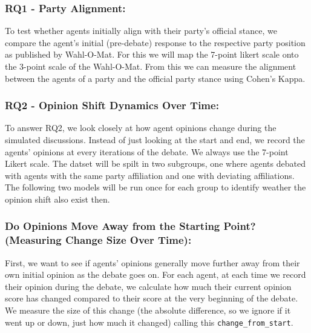 \documentclass[12pt]{article}
\begin{document}
\begin{multicols}{2}

\subsubsection{RQ1 - Party Alignment:}
To test whether agents initially align with their party's official stance, we compare the agent’s initial (pre-debate) response to the respective party position as published by Wahl-O-Mat. For this we will map the 7-point likert scale onto the 3-point scale of the Wahl-O-Mat. From this we can measure the alignment between the agents of  a party and the official party stance using Cohen's Kappa.



\subsubsection{RQ2 - Opinion Shift Dynamics Over Time:}
\label{subsubsex:RQ2}

To answer RQ2, we look closely at how agent opinions change during the simulated discussions. Instead of just looking at the start and end, we record the agents' opinions at every iterations of the debate. We always use the 7-point Likert scale. The datset will be spilt in two subgroups, one where agents debated with agents with the same party affiliation and one with deviating affiliations. The following two models will be run once for each group to identify weather the opinion shift also exist then.


\subsubsection{Do Opinions Move Away from the Starting Point? (Measuring Change Size Over Time):}
First, we want to see if agents' opinions generally move further away from their own initial opinion as the debate goes on. For each agent, at each time we record their opinion during the debate, we calculate how much their current opinion score has changed compared to their score at the very beginning of the debate. We measure the size of this change (the absolute difference, so we ignore if it went up or down, just how much it changed) calling this \texttt{change\_from\_start}.



\end{multicols}
\end{document}
